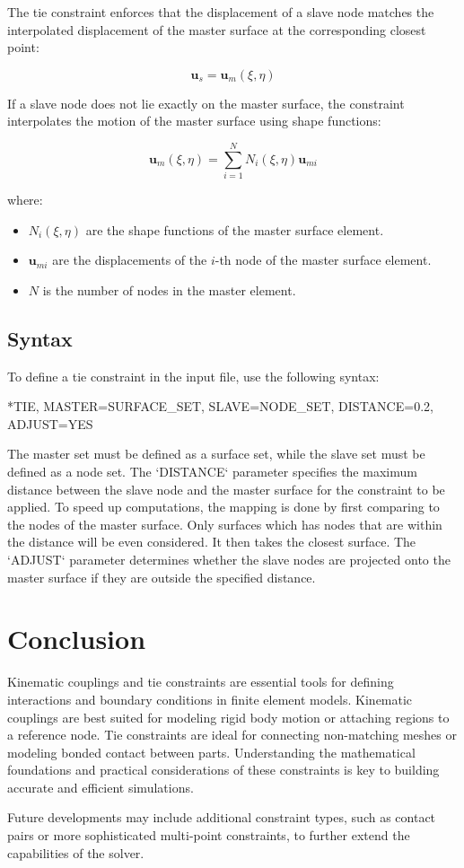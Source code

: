 The tie constraint enforces that the displacement of a slave node matches the interpolated displacement of the master surface at the corresponding closest point:

\[
\mathbf{u}_s = \mathbf{u}_m(\xi, \eta)
\]

If a slave node does not lie exactly on the master surface, the constraint interpolates the motion of the master surface using shape functions:

\[
\mathbf{u}_m(\xi, \eta) = \sum_{i=1}^{N} N_i(\xi, \eta) \mathbf{u}_{mi}
\]

where:
\begin{itemize}
    \item \( N_i(\xi, \eta) \) are the shape functions of the master surface element.
    \item \( \mathbf{u}_{mi} \) are the displacements of the \( i \)-th node of the master surface element.
    \item \( N \) is the number of nodes in the master element.
\end{itemize}

\subsection{Syntax}

To define a tie constraint in the input file, use the following syntax:

\begin{codeBlock}
*TIE, MASTER=SURFACE_SET, SLAVE=NODE_SET, DISTANCE=0.2, ADJUST=YES
\end{codeBlock}

The master set must be defined as a surface set, while the slave set must be defined as a node set.
The `DISTANCE` parameter specifies the maximum distance between the slave node and the master surface for the constraint to be applied.
To speed up computations, the mapping is done by first comparing to the nodes of the master surface. Only surfaces which has nodes that are within the distance will be even considered. It then takes the closest surface.
The `ADJUST` parameter determines whether the slave nodes are projected onto the master surface if they are outside the specified distance.

\section{Conclusion}

Kinematic couplings and tie constraints are essential tools for defining interactions and boundary conditions in finite element models. Kinematic couplings are best suited for modeling rigid body motion or attaching regions to a reference node. Tie constraints are ideal for connecting non-matching meshes or modeling bonded contact between parts. Understanding the mathematical foundations and practical considerations of these constraints is key to building accurate and efficient simulations.

Future developments may include additional constraint types, such as contact pairs or more sophisticated multi-point constraints, to further extend the capabilities of the solver.

